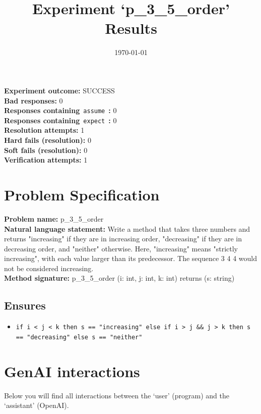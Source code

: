 \documentclass{article}
\begin{document}
\title{Experiment `p\_3\_5\_order' Results}
\author{\today}
\date{}
\maketitle
\textbf{Experiment outcome: }SUCCESS
\\\textbf{Bad responses: }0
\\\textbf{Responses containing}~\texttt{assume}~\textbf{: }0
\\\textbf{Responses containing}~\texttt{expect}~\textbf{: }0
\\\textbf{Resolution attempts: }1
\\\textbf{Hard fails (resolution): }0
\\\textbf{Soft fails (resolution): }0
\\\textbf{Verification attempts: }1
\section*{Problem Specification}
\textbf{Problem name: }p\_3\_5\_order
\\\textbf{Natural language statement: }Write a method that takes three numbers and returns "increasing" if they are in increasing order, "decreasing" if they are in decreasing order, and "neither" otherwise. Here, "increasing" means "strictly increasing", with each value larger than its predecessor. The sequence 3 4 4 would not be considered increasing.
\\\textbf{Method signature: }p\_3\_5\_order (i: int, j: int, k: int) returns (s: string)
\subsection*{Ensures}
\begin{itemize}
\item \texttt{if i < j < k then s == "increasing" else if i > j \&\& j > k then s == "decreasing" else s == "neither"}
\end{itemize}
\clearpage
\section*{GenAI interactions}
Below you will find all interactions between the `user' (program) and the `assistant' (OpenAI).
\end{document}
